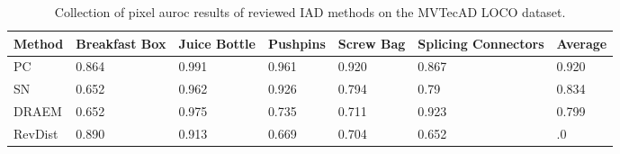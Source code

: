 \begin{table}[htbp]
    \tiny
    \centering
    \begin{tabularx}{\textwidth}{|X|X|X|X|X|X|X|}%
        \hline
        \textbf{Method} & \textbf{Breakfast Box} & \textbf{Juice Bottle} & \textbf{Pushpins} & \textbf{Screw Bag} & \textbf{Splicing Connectors} & \textbf{Average} \\
        \hline
        PC \cite{patchCore2022} & 0.864 & 0.991 & 0.961 & 0.920 & 0.867 & 0.920 \\
        \hline 
        SN \cite{liu2023simplenet} & 0.652 & 0.962 & 0.926 & 0.794 & 0.79 & 0.834 \\
        \hline
        DRAEM \cite{Zavrtanik_2021DRAEM} & 0.652 & 0.975 & 0.735 & 0.711 & 0.923 & 0.799 \\
        \hline
        RevDist \cite{revdist2023} & 0.890 & 0.913 & 0.669 & 0.704 & 0.652 & .0 \\
        \hline
    \end{tabularx}
    \caption{Collection of pixel auroc results of reviewed IAD methods on the MVTecAD LOCO \cite{LOCODentsAndScratchesBergmann2022} dataset.}
    \label{tab:pixelaurocloco}
\end{table}





